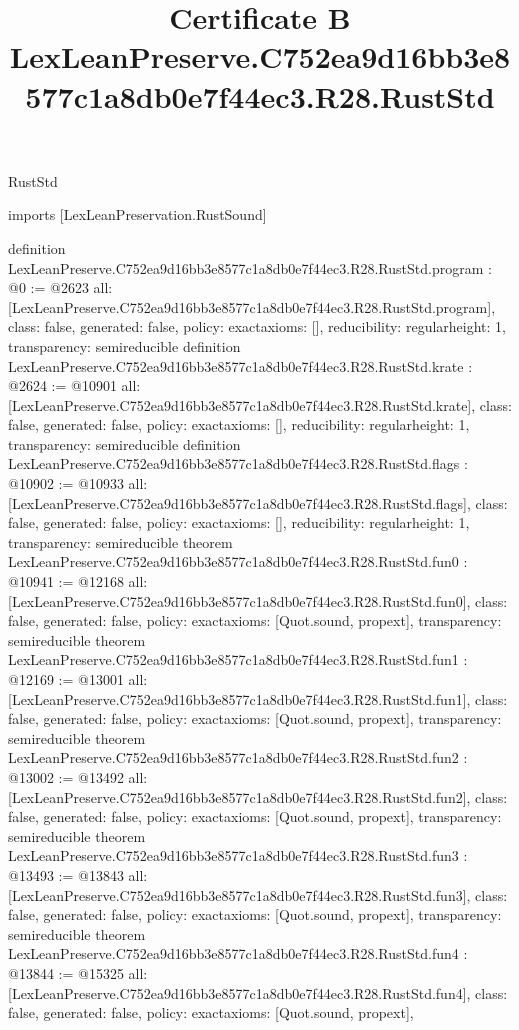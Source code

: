 \begin{lexlean}{RustStd}
\title{Certificate B LexLeanPreserve.C752ea9d16bb3e8577c1a8db0e7f44ec3.R28.RustStd}
\begin{coremodule}
imports [LexLeanPreservation.RustSound]

definition LexLeanPreserve.C752ea9d16bb3e8577c1a8db0e7f44ec3.R28.RustStd.program : @0 := @2623 {
  all: [LexLeanPreserve.C752ea9d16bb3e8577c1a8db0e7f44ec3.R28.RustStd.program],
  class: false,
  generated: false,
  policy: exact{axioms: []},
  reducibility: regular{height: 1},
  transparency: semireducible
}
definition LexLeanPreserve.C752ea9d16bb3e8577c1a8db0e7f44ec3.R28.RustStd.krate : @2624 := @10901 {
  all: [LexLeanPreserve.C752ea9d16bb3e8577c1a8db0e7f44ec3.R28.RustStd.krate],
  class: false,
  generated: false,
  policy: exact{axioms: []},
  reducibility: regular{height: 1},
  transparency: semireducible
}
definition LexLeanPreserve.C752ea9d16bb3e8577c1a8db0e7f44ec3.R28.RustStd.flags : @10902 := @10933 {
  all: [LexLeanPreserve.C752ea9d16bb3e8577c1a8db0e7f44ec3.R28.RustStd.flags],
  class: false,
  generated: false,
  policy: exact{axioms: []},
  reducibility: regular{height: 1},
  transparency: semireducible
}
theorem LexLeanPreserve.C752ea9d16bb3e8577c1a8db0e7f44ec3.R28.RustStd.fun0 : @10941 := @12168 {
  all: [LexLeanPreserve.C752ea9d16bb3e8577c1a8db0e7f44ec3.R28.RustStd.fun0],
  class: false,
  generated: false,
  policy: exact{axioms: [Quot.sound, propext]},
  transparency: semireducible
}
theorem LexLeanPreserve.C752ea9d16bb3e8577c1a8db0e7f44ec3.R28.RustStd.fun1 : @12169 := @13001 {
  all: [LexLeanPreserve.C752ea9d16bb3e8577c1a8db0e7f44ec3.R28.RustStd.fun1],
  class: false,
  generated: false,
  policy: exact{axioms: [Quot.sound, propext]},
  transparency: semireducible
}
theorem LexLeanPreserve.C752ea9d16bb3e8577c1a8db0e7f44ec3.R28.RustStd.fun2 : @13002 := @13492 {
  all: [LexLeanPreserve.C752ea9d16bb3e8577c1a8db0e7f44ec3.R28.RustStd.fun2],
  class: false,
  generated: false,
  policy: exact{axioms: [Quot.sound, propext]},
  transparency: semireducible
}
theorem LexLeanPreserve.C752ea9d16bb3e8577c1a8db0e7f44ec3.R28.RustStd.fun3 : @13493 := @13843 {
  all: [LexLeanPreserve.C752ea9d16bb3e8577c1a8db0e7f44ec3.R28.RustStd.fun3],
  class: false,
  generated: false,
  policy: exact{axioms: [Quot.sound, propext]},
  transparency: semireducible
}
theorem LexLeanPreserve.C752ea9d16bb3e8577c1a8db0e7f44ec3.R28.RustStd.fun4 : @13844 := @15325 {
  all: [LexLeanPreserve.C752ea9d16bb3e8577c1a8db0e7f44ec3.R28.RustStd.fun4],
  class: false,
  generated: false,
  policy: exact{axioms: [Quot.sound, propext]},
}
\end{coremodule}
\end{lexlean}
